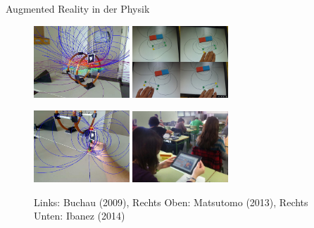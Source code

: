 \begin{frame}[fragile]{Augmented Reality in der Physik}
\pause
	\vspace{0.1cm}
\begin{figure}
	\includegraphics[width=0.32\textwidth]{images/papers/Buchau09.jpg}
	\hspace{0.05cm}
	\includegraphics[width=0.32\textwidth]{images/papers/Matsutomo13.jpg}

	\includegraphics[width=0.32\textwidth]{images/papers/Buchau09_Magnet.jpg}
	\hspace{0.05cm}
	\includegraphics[width=0.32\textwidth]{images/papers/Ibanez14.jpg}

	\setlength{\abovecaptionskip}{7pt plus 5pt minus 2pt}
	\caption*{Links: Buchau (2009), Rechts Oben: Matsutomo (2013), Rechts Unten: Ibanez (2014)}
\end{figure}
\end{frame}


